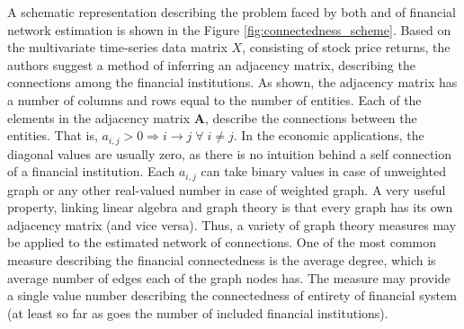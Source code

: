 \documentclass[12pt]{article}
\begin{document}
A schematic representation describing the problem faced by both \cite{billio12} and \cite{diebold17} of financial network estimation is shown in the Figure \ref{fig:connectedness_scheme}. Based on the multivariate time-series data matrix $X$, consisting of stock price returns, the authors suggest a method of inferring an adjacency matrix, describing the connections among the financial institutions. As shown, the adjacency matrix has a number of columns and rows equal to the number of entities. Each of the elements in the adjacency matrix $\boldsymbol{A}$, describe the connections between the entities. That is, $a_{i,j} > 0 \Rightarrow i \rightarrow j \; \forall \;  i \neq j$. In the economic applications, the diagonal values are usually zero, as there is no intuition behind a self connection of a financial institution. Each $a_{i,j}$ can take binary values in case of unweighted graph or any other real-valued number in case of weighted graph. A very useful property, linking linear algebra and graph theory is that every graph has its own adjacency matrix (and vice versa). Thus, a variety of graph theory measures may be applied to the estimated network of connections. One of the most common measure describing the financial connectedness is the average degree, which is average number of edges each of the graph nodes has. The measure may provide a single value number describing the connectedness of entirety of financial system (at least so far as goes the number of included financial institutions). 
\end{document}
